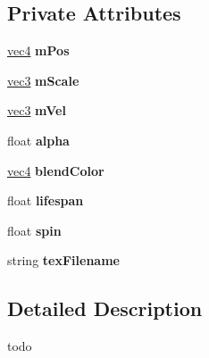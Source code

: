 \subsection*{Private Attributes}
\begin{DoxyCompactItemize}
\item 
\hypertarget{class_particle_a3d51791a544fb2cbf2e93531b3626132}{\hyperlink{struct_angel_1_1vec4}{vec4} {\bfseries m\-Pos}}\label{class_particle_a3d51791a544fb2cbf2e93531b3626132}

\item 
\hypertarget{class_particle_ad18c1ecffb2e5d032732d4cd058bb986}{\hyperlink{struct_angel_1_1vec3}{vec3} {\bfseries m\-Scale}}\label{class_particle_ad18c1ecffb2e5d032732d4cd058bb986}

\item 
\hypertarget{class_particle_a4cd8cbbc5b05126133df8246611339f2}{\hyperlink{struct_angel_1_1vec3}{vec3} {\bfseries m\-Vel}}\label{class_particle_a4cd8cbbc5b05126133df8246611339f2}

\item 
\hypertarget{class_particle_a14af67b37c2acfcbaffcc766b660a5f6}{float {\bfseries alpha}}\label{class_particle_a14af67b37c2acfcbaffcc766b660a5f6}

\item 
\hypertarget{class_particle_a3ec1cf194290dd222d3894e30a111db0}{\hyperlink{struct_angel_1_1vec4}{vec4} {\bfseries blend\-Color}}\label{class_particle_a3ec1cf194290dd222d3894e30a111db0}

\item 
\hypertarget{class_particle_a08108b2a0a2c0ec96f235510cc9aa0a2}{float {\bfseries lifespan}}\label{class_particle_a08108b2a0a2c0ec96f235510cc9aa0a2}

\item 
\hypertarget{class_particle_a73e6af7e8d30f1cbf570cc93fbe6529e}{float {\bfseries spin}}\label{class_particle_a73e6af7e8d30f1cbf570cc93fbe6529e}

\item 
\hypertarget{class_particle_a639147e87ea9fd39b04ac3bafb6ff97b}{string {\bfseries tex\-Filename}}\label{class_particle_a639147e87ea9fd39b04ac3bafb6ff97b}

\end{DoxyCompactItemize}


\subsection{Detailed Description}
todo 

